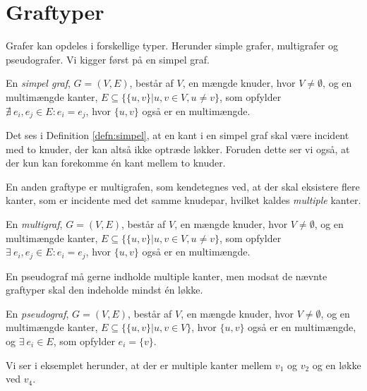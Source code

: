 \section{Graftyper}
Grafer kan opdeles i forskellige typer. Herunder simple grafer, multigrafer og pseudografer. Vi kigger først på en simpel graf.

\begin{defn} \label{defn:simpel}
En \emph{simpel graf}, $G=(V,E)$, består af $V$, en mængde knuder, hvor $V \neq \emptyset$, og en multimængde kanter, $E \subseteq \{\{u,v\}|u,v \in V, u \neq v\}$, som opfylder $\nexists \ e_i, e_j \in E : e_i = e_j$, hvor $\{u,v\}$ også er en multimængde.
\end{defn}

Det ses i Definition \ref{defn:simpel}, at en kant i en simpel graf skal være incident med to knuder, der kan altså ikke optræde løkker. Foruden dette ser vi også, at der kun kan forekomme én kant mellem to knuder.



En anden graftype er multigrafen, som kendetegnes ved, at der skal eksistere flere kanter, som er incidente med det samme knudepar, hvilket kaldes \emph{multiple} kanter.

\begin{defn}[Multigraf] \label{defn:multi}
En \emph{multigraf}, $ G = (V,E)$, består af $V$, en mængde knuder, hvor $V \neq \emptyset$, og en multimængde kanter,
$E \subseteq \{\{u,v\}|u,v \in V, u \neq v\}$, som opfylder $\exists \ e_i, e_j \in E : e_i = e_j$, hvor $\{u,v\}$ også er en multimængde.
\end{defn}



En pseudograf må gerne indholde multiple kanter, men modsat de nævnte graftyper skal den indeholde mindst én løkke. 

\begin{defn}[Pseudograf] \label{defn:pseudo}
En \emph{pseudograf}, $ G = (V,E)$, består af $V$, en mængde knuder, hvor $V \neq \emptyset$, og en multimængde kanter, $E \subseteq \{\{u,v\}|u,v \in V\}$, hvor $\{u,v\}$ også er en multimængde, og $\exists \ e_i \in E$, som opfylder $e_i = \{v\}$.
\end{defn}

Vi ser i eksemplet herunder, at der er multiple kanter mellem $v_{1}$ og $v_{2}$ og en løkke ved $v_{4}$.




